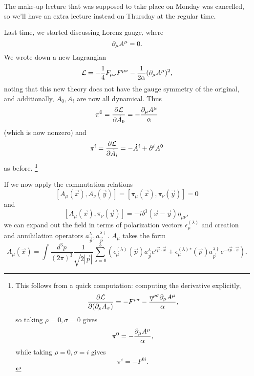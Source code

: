The make-up lecture that was supposed to take place on Monday was cancelled, so we'll have an extra lecture instead on Thursday at the regular time.

Last time, we started discussing Lorenz gauge, where
$$\partial_\mu A^\mu=0.$$
We wrote down a new Lagrangian
$$\mathcal L=-\frac{1}{4}F_{\mu\nu}F^{\mu\nu}-\frac{1}{2\alpha}(\partial_\mu A^\mu)^2,$$
noting that this new theory does not have the gauge symmetry of the original, and additionally, $A_0, A_i$ are now all dynamical. Thus
$$\pi^0=\frac{\partial \mathcal L}{\partial \dot A_0}=-\frac{\partial_\mu A^\mu}{\alpha}$$
(which is now nonzero) and
$$\pi^i = \frac{\partial \mathcal L}{\partial \dot A_i}=-\dot A^i +\partial^i A^0$$
as before.%
    \footnote{This follows from a quick computation: computing the derivative explicitly,
    \begin{equation*}
        \frac{\partial \mathcal L}{\partial (\partial_\rho A_\sigma)} = -F^{\rho\sigma} -\frac{\eta^{\rho\sigma}\partial_\mu A^\mu}{\alpha},
    \end{equation*}
    so taking $\rho=0,\sigma=0$ gives
    \begin{equation*}
        \pi^0 = -\frac{ \partial_\mu A^\mu}{\alpha},
    \end{equation*}
    while taking $\rho=0,\sigma=i$ gives
    \begin{equation*}
        \pi^i = -F^{0i}.
    \end{equation*}
    }

If we now apply the commutation relations
$$[A_\mu(\vec x),A_\nu (\vec y)]=[\pi_\mu(\vec x),\pi_\nu (\vec y)]=0$$
and
$$[A_\mu(\vec x),\pi_\nu(\vec y)]=-i \delta^3(\vec x- \vec y)\eta_{\mu\nu},$$
we can expand out the field in terms of polarization vectors $\epsilon_\mu^{(\lambda)}$ and creation and annihilation operators $a_{\vec p}^\lambda, a_{\vec p}^{\lambda\dagger}.$
$A_\mu$ takes the form
$$A_\mu(\vec x) =\int \frac{d^3p}{(2\pi)^3} \frac{1}{\sqrt{2|\vec p|}} \sum_{\lambda=0}^3 \left(\epsilon_\mu^{(\lambda)}(\vec p) a_{\vec p}^\lambda e^{i \vec p \cdot \vec x}+\epsilon_\mu^{(\lambda)}{}^* (\vec p) a_{\vec p}^{\lambda \dagger} e^{-i\vec p \cdot \vec x}\right).$$

